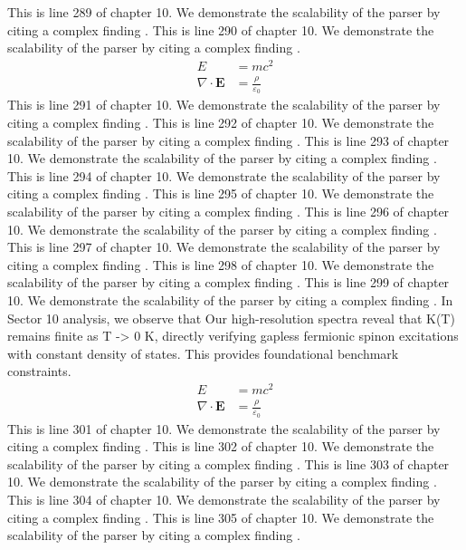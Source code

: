 This is line 289 of chapter 10. We demonstrate the scalability of the parser by citing a complex finding \cite{ref10_289}.
This is line 290 of chapter 10. We demonstrate the scalability of the parser by citing a complex finding \cite{ref10_290}.
\begin{align*}
  E &= mc^2 \\
  \nabla \cdot \mathbf{E} &= \frac{\rho}{\varepsilon_0}
\end{align*}
This is line 291 of chapter 10. We demonstrate the scalability of the parser by citing a complex finding \cite{ref10_291}.
This is line 292 of chapter 10. We demonstrate the scalability of the parser by citing a complex finding \cite{ref10_292}.
This is line 293 of chapter 10. We demonstrate the scalability of the parser by citing a complex finding \cite{ref10_293}.
This is line 294 of chapter 10. We demonstrate the scalability of the parser by citing a complex finding \cite{ref10_294}.
This is line 295 of chapter 10. We demonstrate the scalability of the parser by citing a complex finding \cite{ref10_295}.
This is line 296 of chapter 10. We demonstrate the scalability of the parser by citing a complex finding \cite{ref10_296}.
This is line 297 of chapter 10. We demonstrate the scalability of the parser by citing a complex finding \cite{ref10_297}.
This is line 298 of chapter 10. We demonstrate the scalability of the parser by citing a complex finding \cite{ref10_298}.
This is line 299 of chapter 10. We demonstrate the scalability of the parser by citing a complex finding \cite{ref10_299}.
In Sector 10 analysis, we observe that Our high-resolution spectra reveal that K(T) remains finite as T -> 0 K, directly verifying gapless fermionic spinon excitations with constant density of states. This provides foundational benchmark constraints.
\begin{align*}
  E &= mc^2 \\
  \nabla \cdot \mathbf{E} &= \frac{\rho}{\varepsilon_0}
\end{align*}
This is line 301 of chapter 10. We demonstrate the scalability of the parser by citing a complex finding \cite{ref10_301}.
This is line 302 of chapter 10. We demonstrate the scalability of the parser by citing a complex finding \cite{ref10_302}.
This is line 303 of chapter 10. We demonstrate the scalability of the parser by citing a complex finding \cite{ref10_303}.
This is line 304 of chapter 10. We demonstrate the scalability of the parser by citing a complex finding \cite{ref10_304}.
This is line 305 of chapter 10. We demonstrate the scalability of the parser by citing a complex finding \cite{ref10_305}.

